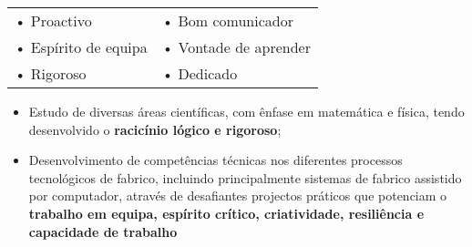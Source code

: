 \documentclass[10pt,a4paper]{altacv}
\begin{document}
\tagline{}

\begin{fullwidth}
\makecvheader
\end{fullwidth}


\smallskip

\begin{tabularx}{\linewidth}{X X}
	• Proactivo & • Bom comunicador  \\
	• Espírito de equipa         & • Vontade de aprender     \\
	• Rigoroso    & • Dedicado
\end{tabularx}




\medskip

\begin{itemize}
	\item Estudo de diversas áreas científicas, com ênfase em matemática e física, tendo desenvolvido o \textbf{racicínio lógico e rigoroso};
	\item Desenvolvimento de competências técnicas nos diferentes processos tecnológicos de fabrico, incluindo principalmente sistemas de fabrico assistido por computador, através de desafiantes projectos práticos que potenciam o \textbf{trabalho em equipa, espírito crítico, criatividade, resiliência e capacidade de trabalho}
\end{itemize}
\end{document}
